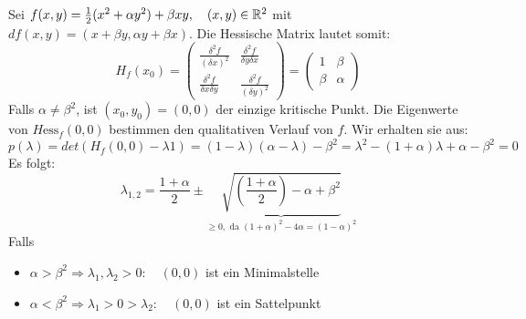 \documentclass[a4paper]{article}
\begin{document}
		\begin{fmerke}
			Sei $f(x,y) = \frac{1}{2}(x^2 + \alpha y^2) + \beta xy, \quad (x,y) \in \mathbb{R}^2$ mit $df(x,y) = (x+ \beta y, \alpha y + \beta x)$. 
			Die Hessische Matrix lautet somit:
			$$ H_f(x_0) = \left( \begin{array}{cc}
									\frac{\delta^2 f}{(\delta x)^2} & 	\frac{\delta^2 f}{\delta y \delta x} \\
									\frac{\delta^2 f}{\delta x \delta y} & \frac{\delta^2 f}{(\delta y)^2}
								\end{array} \right) =
								\left( \begin{array}{cc}
										1 & \beta \\
										\beta & \alpha
										\end{array} \right)
			$$
			Falls $\alpha \neq \beta^2$, ist $(x_0, y_0) = (0,0)$ der einzige kritische Punkt. Die Eigenwerte von $H\text{ess}_f(0,0)$ bestimmen den qualitativen Verlauf von $f$. Wir erhalten sie aus: 
			$$p(\lambda) = det(H_f(0,0)- \lambda 1) = (1-\lambda)(\alpha - \lambda) - \beta^2= \lambda^2 - (1+\alpha) \lambda + \alpha - \beta^2 = 0$$
			Es folgt:
			$$\lambda_{1,2} = \frac{1+\alpha}{2} \pm \underbrace{\sqrt{\left( \frac{1+\alpha}{2} \right) - \alpha + \beta^2}}_{\geq 0, \text{ da } (1+\alpha)^2- 4\alpha = (1-\alpha)^2}$$
			Falls
			\begin{itemize} 
			\item $\alpha > \beta^2 \Rightarrow \lambda_1, \lambda_2 > 0: \quad (0,0)$ ist ein Minimalstelle
			\item $\alpha < \beta^2 \Rightarrow \lambda_1 > 0 > \lambda_2: \quad (0,0)$ ist ein Sattelpunkt
			\end{itemize}
		\end{fmerke}
		
\end{document}
